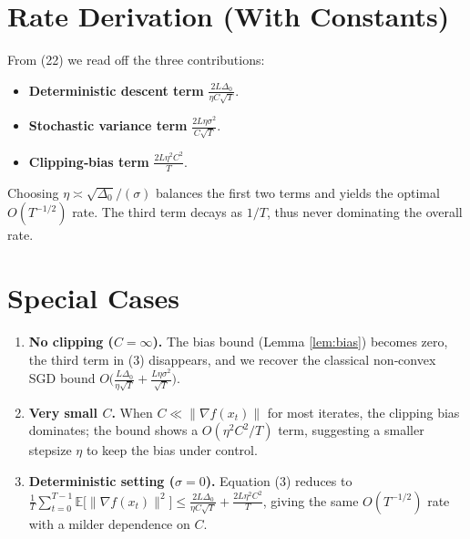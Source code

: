 \documentclass{article}
\newcommand{\E}{\mathbb{E}}
\begin{document}
\section*{Rate Derivation (With Constants)}
From (22) we read off the three contributions:
\begin{itemize}
\item \textbf{Deterministic descent term} $\displaystyle \frac{2L\Delta_{0}}{\eta C\sqrt{T}}$.
\item \textbf{Stochastic variance term} $\displaystyle \frac{2L\eta\sigma^{2}}{C\sqrt{T}}$.
\item \textbf{Clipping‑bias term} $\displaystyle \frac{2L\eta^{2}C^{2}}{T}$.
\end{itemize}
Choosing $\eta\asymp \sqrt{\Delta_{0}}/(\sigma)$ balances the first two terms and yields the optimal $O(T^{-1/2})$ rate. The third term decays as $1/T$, thus never dominating the overall rate.

\section*{Special Cases}
\begin{enumerate}
\item \textbf{No clipping ($C=\infty$).}  
The bias bound (Lemma \ref{lem:bias}) becomes zero, the third term in (3) disappears, and we recover the classical non‑convex SGD bound $\displaystyle O\!\big(\tfrac{L\Delta_{0}}{\eta\sqrt{T}}+\tfrac{L\eta\sigma^{2}}{\sqrt{T}}\big)$.
\item \textbf{Very small $C$.}  
When $C\ll\|\nabla f(x_{t})\|$ for most iterates, the clipping bias dominates; the bound shows a $O(\eta^{2}C^{2}/T)$ term, suggesting a smaller stepsize $\eta$ to keep the bias under control.
\item \textbf{Deterministic setting ($\sigma=0$).}  
Equation (3) reduces to $\displaystyle \frac{1}{T}\sum_{t=0}^{T-1}\E\!\big[\|\nabla f(x_{t})\|^{2}\big]\le \frac{2L\Delta_{0}}{\eta C\sqrt{T}}+\frac{2L\eta^{2}C^{2}}{T}$, giving the same $O(T^{-1/2})$ rate with a milder dependence on $C$.
\end{enumerate}
\end{document}

